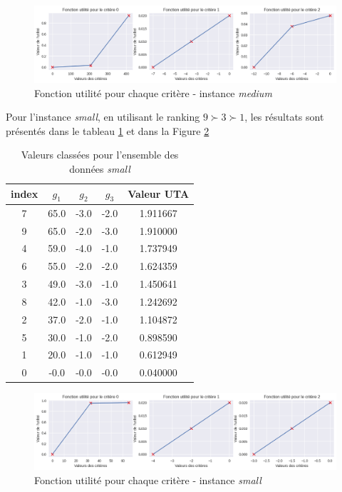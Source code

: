 \documentclass[12pt, a4paper, french, version=last, parskip=half, titlepage]{scrartcl}
\begin{document}
\begin{figure}[h]
\centering
\includegraphics[width=1\textwidth]{images/uta_function.png}
\caption{Fonction utilité pour chaque critère - instance \emph{medium}}
\label{fig:uta_medium}
\end{figure}    

Pour l'instance \emph{small}, en utilisant le ranking $9 \succ 3 \succ 1$, les résultats sont présentés dans le tableau \ref{tab:uta_small} et dans la Figure \ref{fig:uta_small}

\begin{table}
\centering
\begin{tabular}{c c c c c}
    \toprule
     index & $g_1$ & $g_2$ & $g_3$ & Valeur UTA \\
     \midrule
    7 & 65.0 & -3.0 & -2.0 & 1.911667 \\
    9 & 65.0 & -2.0 & -3.0 & 1.910000 \\
    4 & 59.0 & -4.0 & -1.0 & 1.737949 \\
    6 & 55.0 & -2.0 & -2.0 & 1.624359 \\
    3 & 49.0 & -3.0 & -1.0 & 1.450641 \\
    8 & 42.0 & -1.0 & -3.0 & 1.242692 \\
    2 & 37.0 & -2.0 & -1.0 & 1.104872 \\
    5 & 30.0 & -1.0 & -2.0 & 0.898590 \\
    1 & 20.0 & -1.0 & -1.0 & 0.612949 \\
    0 & -0.0 & -0.0 & -0.0 & 0.040000 \\
    \bottomrule
\end{tabular}
\caption{Valeurs classées pour l'ensemble des données \emph{small}}
\label{tab:uta_small}
\end{table}


\begin{figure}[H]
\centering
\includegraphics[width=1\textwidth]{images/uta_small.png}
\caption{Fonction utilité pour chaque critère - instance \emph{small}}
\label{fig:uta_small}
\end{figure}    
\end{document}
